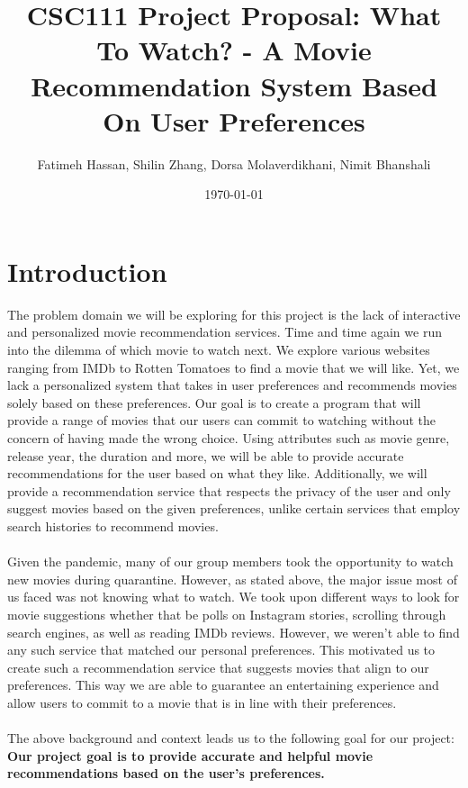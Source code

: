 \documentclass[fontsize=11pt]{article}
\title{CSC111 Project Proposal: What To Watch? - A Movie Recommendation System Based On User Preferences}
\author{Fatimeh Hassan, Shilin Zhang, Dorsa Molaverdikhani, Nimit Bhanshali}
\date{\today}
\begin{document}
\maketitle

\section*{Introduction}
The problem domain we will be exploring for this project is the lack of interactive and personalized movie recommendation services. Time and time again we run into the dilemma of which movie to watch next. We explore various websites ranging from IMDb to Rotten Tomatoes to find a movie that we will like. Yet, we lack a personalized system that takes in user preferences and recommends movies solely based on these preferences. Our goal is to create a program that will provide a range of movies that our users can commit to watching without the concern of having made the wrong choice. Using attributes such as movie genre, release year, the duration and more, we will be able to provide accurate recommendations for the user based on what they like. Additionally, we will provide a recommendation service that respects the privacy of the user and only suggest movies based on the given preferences, unlike certain services that employ search histories to recommend movies.
\\\\
Given the pandemic, many of our group members took the opportunity to watch new movies during quarantine. However, as stated above, the major issue most of us faced was not knowing what to watch. We took upon different ways to look for movie suggestions whether that be polls on Instagram stories, scrolling through search engines, as well as reading IMDb reviews. However, we weren't able to find any such service that matched our personal preferences. This motivated us to create such a recommendation service that suggests movies that align to our preferences. This way we are able to guarantee an entertaining experience and allow users to commit to a movie that is in line with their preferences.
\\\\
The above background and context leads us to the following goal for our project:
\textbf{Our project goal is to provide accurate and helpful movie recommendations based on the user's preferences.}
\end{document}
